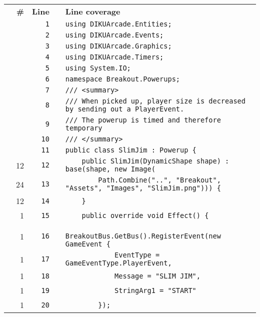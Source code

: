 \documentclass[a4paper,landscape,10pt]{article}
\begin{document}
\begin{longtable}[l]{lrrll}
\textbf{} & \textbf{\#} & \textbf{Line} & \textbf{} & \textbf{Line coverage}\\
\cellcolor{gray} &  & \verb~1~ & & \verb~using DIKUArcade.Entities;~\\
\cellcolor{gray} &  & \verb~2~ & & \verb~using DIKUArcade.Events;~\\
\cellcolor{gray} &  & \verb~3~ & & \verb~using DIKUArcade.Graphics;~\\
\cellcolor{gray} &  & \verb~4~ & & \verb~using DIKUArcade.Timers;~\\
\cellcolor{gray} &  & \verb~5~ & & \verb~using System.IO;~\\
\cellcolor{gray} &  & \verb~6~ & & \verb~namespace Breakout.Powerups;~\\
\cellcolor{gray} &  & \verb~7~ & & \verb~/// <summary>~\\
\cellcolor{gray} &  & \verb~8~ & & \verb~/// When picked up, player size is decreased by sending out a PlayerEvent.~\\
\cellcolor{gray} &  & \verb~9~ & & \verb~/// The powerup is timed and therefore temporary~\\
\cellcolor{gray} &  & \verb~10~ & & \verb~/// </summary>~\\
\cellcolor{gray} &  & \verb~11~ & & \verb~public class SlimJim : Powerup {~\\
\cellcolor{green} & 12 & \verb~12~ & & \verb~    public SlimJim(DynamicShape shape) : base(shape, new Image(~\\
\cellcolor{green} & 24 & \verb~13~ & & \verb~        Path.Combine("..", "Breakout", "Assets", "Images", "SlimJim.png"))) {~\\
\cellcolor{green} & 12 & \verb~14~ & & \verb~    }~\\
\cellcolor{green} & 1 & \verb~15~ & & \verb~    public override void Effect() {~\\
\cellcolor{green} & 1 & \verb~16~ & & \verb~        BreakoutBus.GetBus().RegisterEvent(new GameEvent {~\\
\cellcolor{green} & 1 & \verb~17~ & & \verb~            EventType = GameEventType.PlayerEvent,~\\
\cellcolor{green} & 1 & \verb~18~ & & \verb~            Message = "SLIM JIM",~\\
\cellcolor{green} & 1 & \verb~19~ & & \verb~            StringArg1 = "START"~\\
\cellcolor{green} & 1 & \verb~20~ & & \verb~        });~\\

\end{longtable}
\end{document}
